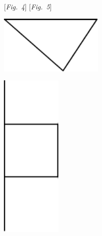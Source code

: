 \pend
\vspace{11mm}
\pstart
\hspace*{21mm} [\textit{Fig.~4}] \label{LH_35_14_02_046v,047v_Fig.4}\hspace*{56mm} [\textit{Fig.~5}] \label{LH_35_14_02_046v,047v_Fig.5}
\pend
\vspace{3em}
%
%
\pstart{}\hspace{6mm}
\begin{minipage}[t]{0.33\textwidth}\vspace{-17mm}
\includegraphics[width=0.38\textwidth]{gesamttex/edit_VIII,3/images/LH_35_14_02_046v,047v_d6.pdf}
\end{minipage}
\hspace{2mm}
\begin{minipage}[t]{0.33\textwidth}
\includegraphics[width=0.22\textwidth]{gesamttex/edit_VIII,3/images/LH_35_14_02_046v,047v_d7.pdf}
\end{minipage}

